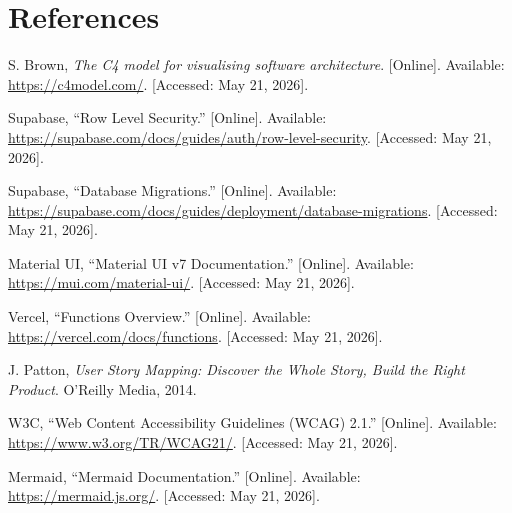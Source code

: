 \documentclass[11pt,letterpaper]{article}
\begin{document}
\newpage

\section*{References}

\begin{enumerate}[label={[\arabic*]}]
  \item S. Brown, \emph{The C4 model for visualising software
        architecture}. [Online]. Available:
        \url{https://c4model.com/}. [Accessed: May 21, 2026].
  \item Supabase, ``Row Level Security.'' [Online]. Available:
        \url{https://supabase.com/docs/guides/auth/row-level-security}.
        [Accessed: May 21, 2026].
  \item Supabase, ``Database Migrations.'' [Online]. Available:
        \url{https://supabase.com/docs/guides/deployment/database-migrations}.
        [Accessed: May 21, 2026].
  \item Material UI, ``Material UI v7 Documentation.'' [Online].
        Available: \url{https://mui.com/material-ui/}. [Accessed:
        May 21, 2026].
  \item Vercel, ``Functions Overview.'' [Online]. Available:
        \url{https://vercel.com/docs/functions}. [Accessed: May
        21, 2026].
  \item J. Patton, \emph{User Story Mapping: Discover the Whole
        Story, Build the Right Product}. O'Reilly Media, 2014.
  \item W3C, ``Web Content Accessibility Guidelines (WCAG) 2.1.''
        [Online]. Available: \url{https://www.w3.org/TR/WCAG21/}.
        [Accessed: May 21, 2026].
  \item Mermaid, ``Mermaid Documentation.'' [Online]. Available:
        \url{https://mermaid.js.org/}. [Accessed: May 21, 2026].
\end{enumerate}
\end{document}
